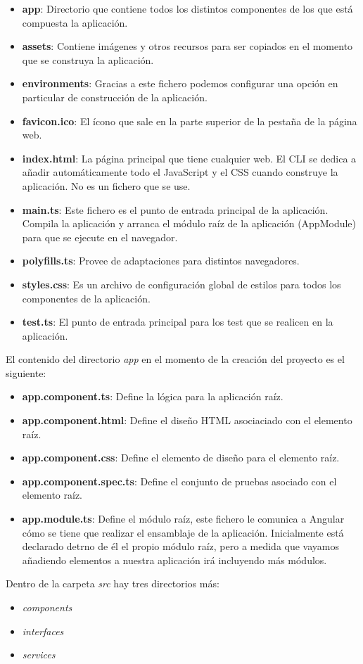\begin{itemize}
    \item \textbf{app}: Directorio que contiene todos los distintos componentes de los que está compuesta la aplicación.
    \item \textbf{assets}: Contiene imágenes y otros recursos para ser copiados en el momento que se construya la aplicación.
    \item \textbf{environments}: Gracias a este fichero podemos configurar una opción en particular de construcción de la aplicación.
    \item \textbf{favicon.ico}: El ícono que sale en la parte superior de la pestaña de la página web.
    \item \textbf{index.html}: La página principal que tiene cualquier web. El CLI se dedica a añadir automáticamente todo el JavaScript y el CSS cuando construye la aplicación. No es un fichero que se use.
    \item \textbf{main.ts}: Este fichero es el punto de entrada principal de la aplicación. Compila la aplicación y arranca el módulo raíz de la aplicación (AppModule) para que se ejecute en el navegador.
    \item \textbf{polyfills.ts}: Provee de adaptaciones para distintos navegadores.
    \item \textbf{styles.css}: Es un archivo de configuración global de estilos para todos los componentes de la aplicación.
    \item \textbf{test.ts}: El punto de entrada principal para los test que se realicen en la aplicación.
\end{itemize}

El contenido del directorio \textit{app} en el momento de la creación del proyecto es el siguiente:

\begin{itemize}
    \item \textbf{app.component.ts}: Define la lógica para la aplicación raíz.
    \item \textbf{app.component.html}: Define el diseño HTML asociaciado con el elemento raíz.
    \item \textbf{app.component.css}: Define el elemento de diseño para el elemento raíz.
    \item \textbf{app.component.spec.ts}: Define el conjunto de pruebas asociado con el elemento raíz.
    \item \textbf{app.module.ts}: Define el módulo raíz, este fichero le comunica a Angular cómo se tiene que realizar el ensamblaje de la aplicación. Inicialmente está declarado detrno de él el propio módulo raíz, pero a medida que vayamos añadiendo elementos a nuestra aplicación irá incluyendo más módulos.
\end{itemize}

Dentro de la carpeta \textit{src} hay tres directorios más:
\begin{itemize}
    \item \textit{components}
    \item \textit{interfaces}
    \item \textit{services}
\end{itemize}